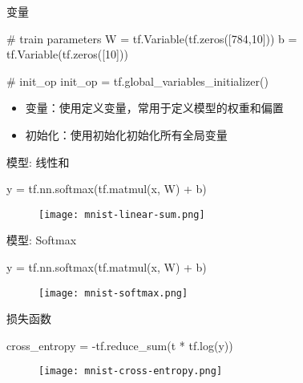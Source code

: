 \begin{frame}[fragile]{变量}
\begin{python}
# train parameters
W = tf.Variable(tf.zeros([784,10]))
b = tf.Variable(tf.zeros([10]))

# init\_op
init_op = tf.global_variables_initializer()
\end{python}

\begin{itemize}
  \item \alert{变量}：使用定义变量，常用于定义模型的权重和偏置
  \item \alert{初始化}：使用初始化初始化所有全局变量 
\end{itemize}
\end{frame}

\begin{frame}[fragile]{模型: 线性和}
  \begin{python}
y = tf.nn.softmax(tf.matmul(x, W) + b)
  \end{python}

  \begin{figure}
    \centering
    \texttt{[image: mnist-linear-sum.png]}
  \end{figure}
\end{frame}

\begin{frame}[fragile]{模型: Softmax}
  \begin{python}
y = tf.nn.softmax(tf.matmul(x, W) + b)
  \end{python}

  \begin{figure}
    \centering
    \texttt{[image: mnist-softmax.png]}
  \end{figure}
\end{frame}

\begin{frame}[fragile]{损失函数}
  \begin{python}
cross_entropy = -tf.reduce_sum(t * tf.log(y))
  \end{python}

  \begin{figure}
    \centering
    \texttt{[image: mnist-cross-entropy.png]}
  \end{figure}
\end{frame}

